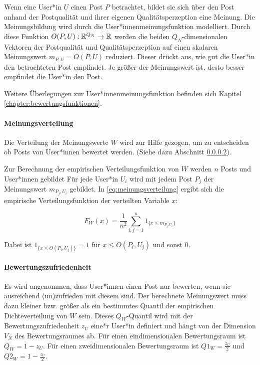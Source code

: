 Wenn eine User*in $U$ einen Post $P$ betrachtet, bildet sie sich über den Post anhand der Postqualität und ihrer eigenen Qualitätsperzeption eine Meinung. Die Meinungsbildung wird durch die User*innenmeinungsfunktion modelliert. Durch diese Funktion $O(P,U): \mathbb{R}^{Q_N} \rightarrow \mathbb{R} $ werden die beiden $Q_N$-dimensionalen Vektoren der Postqualität und Qualitätsperzeption auf einen skalaren Meinungswert $m_{P,U} = O(P,U)$ reduziert. Dieser drückt aus, wie gut die User*in den betrachteten Post empfindet. Je größer der Meinungswert ist, desto besser empfindet die User*in den Post.

Weitere Überlegungen zur User*innenmeinungsfunktion befinden sich Kapitel \ref{chapter:bewertungsfunktionen}.

\paragraph{Meinungsverteilung}

Die Verteilung der Meinungswerte $W$ wird zur Hilfe gezogen, um zu entscheiden ob Posts von User*innen bewertet werden. (Siehe dazu Abschnitt \ref{bewertungszufriedenheit}).

Zur Berechnung der empirischen Verteilungsfunktion von $W$ werden $n$ Posts und User*innen gebildet Für jede User*in $U_i$ wird mit jedem Post $P_j$ der Meinungswert $m_{P_j, U_i}$ gebildet. In \ref{eq:meinungsverteilung} ergibt sich die empirische Verteilungsfunktion der verteilten Variable $x$:

\begin{equation}
\label{eq:meinungsverteilung}
F_W(x) = \frac{1}{n^2}\sum_{i,j = 1}^{n} 1_{\{x \leq m_{P_j, U_i}\}}
\end{equation}

Dabei ist  $1_{\{x \leq O(P_i,U_j)\}} = 1$ für $x \leq O(P_i,U_j)$ und sonst $0$.


\paragraph{Bewertungszufriedenheit}
\label{bewertungszufriedenheit}

Es wird angenommen, dass User*innen einen Post nur bewerten, wenn sie ausreichend (un)zufrieden mit diesem sind. Der berechnete Meinungswert muss dazu kleiner bzw. größer als ein bestimmtes Quantil der empirischen Dichteverteilung von $W$ sein. Dieses $Q_W$-Quantil wird mit der Bewertungszufriedenheit $z_U$ eine*r User*in definiert und hängt von der Dimension $V_N$ des Bewertungsraumes ab. Für einen eindimensionalen Bewertungsraum ist $Q_W = 1 - z_U$. Für einen zweidimensionalen Bewertungsraum ist $Q1_W = \frac{z_U}{2}$ und $Q2_W = 1 - \frac{z_U}{2}$.

